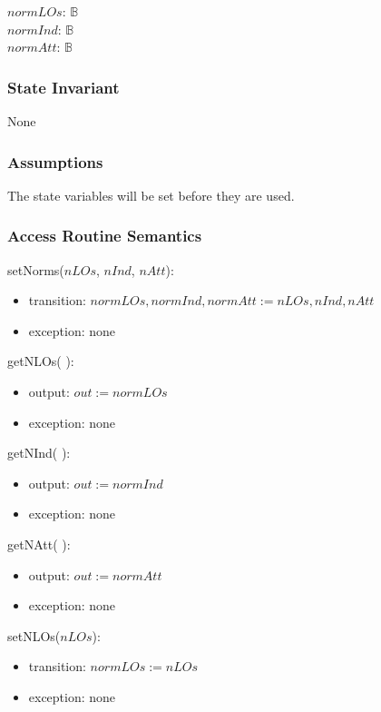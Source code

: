 \documentclass[12pt]{article}
\begin{document}
$\mathit{normLOs}$: $\mathbb{B}$\\
$\mathit{normInd}$: $\mathbb{B}$\\
$\mathit{normAtt}$: $\mathbb{B}$

\subsubsection* {State Invariant}

None

\subsubsection* {Assumptions}

The state variables will be set before they are used.

\subsubsection* {Access Routine Semantics}

\noindent setNorms($\mathit{nLOs}$, $\mathit{nInd}$, $\mathit{nAtt}$):
\begin{itemize}
\item transition: $\mathit{normLOs}, \mathit{normInd}, \mathit{normAtt} := \mathit{nLOs}, \mathit{nInd}, \mathit{nAtt}$
\item exception: none
\end{itemize}

\noindent getNLOs( ):
\begin{itemize}
\item output: $out := \mathit{normLOs}$
\item exception: none
\end{itemize}

\noindent getNInd( ):
\begin{itemize}
\item output: $out := \mathit{normInd}$
\item exception: none
\end{itemize}

\noindent getNAtt( ):
\begin{itemize}
\item output: $out := \mathit{normAtt}$
\item exception: none
\end{itemize}

\noindent setNLOs($\mathit{nLOs}$):
\begin{itemize}
\item transition: $\mathit{normLOs} := \mathit{nLOs}$
\item exception: none
\end{itemize}
\end{document}
